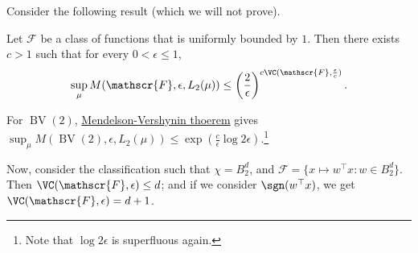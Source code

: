 Consider the following result (which we will not prove).

\begin{theorem}\label{thm:Mendelson-Vershynin}
	Let \(\mathscr{F} \) be a class of functions that is uniformly bounded by \(1\). Then there exists \(c > 1\) such that for every \(0 < \epsilon \leq 1\),
	\[
		\sup _\mu M(\mathscr{F} , \epsilon , L_2(\mu )) \leq \left( \frac{2}{\epsilon } \right) ^{c \VC(\mathscr{F} , \frac{\epsilon}{c})}.
	\]
\end{theorem}

\begin{remark}
	For \(\mathop{\mathrm{BV}}(2) \), \hyperref[thm:Mendelson-Vershynin]{Mendelson-Vershynin thoerem} gives \(\sup _\mu M(\mathop{\mathrm{BV}}(2) , \epsilon , L_2(\mu )) \leq \exp (\frac{c}{\epsilon } \log 2\epsilon )\).\footnote{Note that \(\log 2\epsilon \) is superfluous again.}
\end{remark}

Now, consider the classification such that \(\chi = B_2^d\), and \(\mathscr{F} = \{ x \mapsto w^{\top} x \colon w\in B_2^d \} \). Then \(\VC(\mathscr{F} , \epsilon ) \leq d\); and if we consider \(\sgn (w^{\top} x)\), we get \(\VC(\mathscr{F} , \epsilon ) = d+1\).